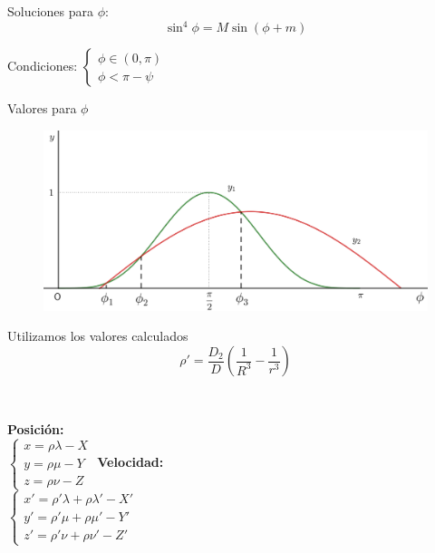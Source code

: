 \documentclass{beamer}
\newcommand\ddfrac[2]{\frac{\displaystyle #1}{\displaystyle #2}}
\begin{document}
\begin{frame}
Soluciones para $\phi$:
\[
\sin^4{\phi}=M\sin{(\phi + m)}
\]
\vspace{0.6666cm}
\pause

Condiciones: \hspace{0.5cm}
$
\left\{
\begin{array}{l}
\phi\in(0,\pi)\\
\phi<\pi-\psi
\end{array}
\right.
$
\end{frame}

\begin{frame}{Valores para $\phi$}
\begin{figure}[H]
\centering
\includegraphics[scale=0.1]{images/phi_solution_m_negative_M_near_1.png}
\end{figure}

\end{frame}

\begin{frame}{Utilizamos los valores calculados}
\[\rho'=\ddfrac{D_2}{D}\left(\ddfrac{1}{R^3}-\ddfrac{1}{r^3}\right)\]\\
\vspace{1cm}

\pause
\begin{columns}
\textbf{Posición:}\\
\vspace{0.4cm}
$
\left\{
\begin{array}{l}
	x=\rho\lambda-X\\
	y=\rho\mu-Y\\
	z=\rho\nu-Z
\end{array}
\right.
$
\textbf{Velocidad:}\\
\vspace{0.4cm}
$
\left\{
\begin{array}{l}
	x'=\rho'\lambda+\rho\lambda'-X'\\
	y'=\rho'\mu+\rho\mu'-Y'\\
	z'=\rho'\nu+\rho\nu'-Z'
\end{array}
\right.
$
\end{columns}
\end{frame}
\end{document}
